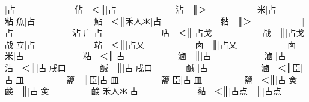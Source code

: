 {\cjk{}{\cnsym{}　　　　　}}|{\cjk{}占{\cnsym{}　　　　　　　}佔{\cnsym{}　}＜}║{\cjk{}{\cnsym{}　　　　　　}}|{\cjk{}占{\cnsym{}　　　　　　　}沾{\cnsym{}　}}║{\cjk{}＞{\cnsym{}　　　　　　}米}|{\cjk{}占{\cnsym{}　　　　　　　}粘} 
{\cjk{}{\cnsym{}　　　　　}魚}|{\cjk{}占{\cnsym{}　　　　　　　}鮎{\cnsym{}　}＜}║{\cjk{}{\cnsym{}　　　　}禾人氺}|{\cjk{}占{\cnsym{}　　　　　　　}黏{\cnsym{}　}}║{\cjk{}＞{\cnsym{}　　　　　　}}|{\cjk{}占{\cnsym{}　　　　　　　}沾} 
{\cjk{}{\cnsym{}　　　　　}广}|{\cjk{}占{\cnsym{}　　　　　　　}店{\cnsym{}　}＜}║{\cjk{}{\cnsym{}　　　　　　　}}|{\cjk{}占戈{\cnsym{}　　　　　　}战{\cnsym{}　}}║{\cjk{}{\cnsym{}　　　　　　　　}}|{\cjk{}占戈{\cnsym{}　　　　　　}战} 
{\cjk{}{\cnsym{}　　　　　}立}|{\cjk{}占{\cnsym{}　　　　　　　}站{\cnsym{}　}＜}║{\cjk{}{\cnsym{}　　　　　　　}}|{\cjk{}占乂{\cnsym{}　　　　　　}卤{\cnsym{}　}}║{\cjk{}{\cnsym{}　　　　　　　　}}|{\cjk{}占乂{\cnsym{}　　　　　　}卤} 
{\cjk{}{\cnsym{}　　　　　}米}|{\cjk{}占{\cnsym{}　　　　　　　}粘{\cnsym{}　}＜}║{\cjk{}{\cnsym{}　　　　　　}}|{\cjk{}占{\cnxb{}𠂭}{\cnsym{}　　　　　　}滷{\cnsym{}　}}║{\cjk{}{\cnsym{}　　　　　　　}}|{\cjk{}占{\cnxb{}𠂭}{\cnsym{}　　　　　　}滷} 
{\cjk{}{\cnsym{}　　　　　}}|{\cjk{}占{\cnsym{}　　　　　　　}沾{\cnsym{}　}＜}║{\cjk{}{\cnsym{}　　　　　　　}}|{\cjk{}占{\cnxb{}𠂭}戌口{\cnsym{}　　　　}鹹{\cnsym{}　}}║{\cjk{}{\cnsym{}　　　　　　　　}}|{\cjk{}占{\cnxb{}𠂭}戌口{\cnsym{}　　　　}鹹} 
{\cjk{}{\cnsym{}　　　　　}}|{\cjk{}占{\cnxb{}𠂭}{\cnsym{}　　　　　　}滷{\cnsym{}　}＜}║{\cjk{}{\cnsym{}　　　　　}臣}|{\cjk{}占{\cnxb{}𠂭}皿{\cnsym{}　　　　　}鹽{\cnsym{}　}}║{\cjk{}{\cnsym{}　　　　　　}臣}|{\cjk{}占{\cnxb{}𠂭}皿{\cnsym{}　　　　　}鹽} 
{\cjk{}{\cnsym{}　　　　}臣}|{\cjk{}占{\cnxb{}𠂭}皿{\cnsym{}　　　　　}鹽{\cnsym{}　}＜}║{\cjk{}{\cnsym{}　　　　　　　}}|{\cjk{}占{\cnxb{}𠂭}{\cnxa{}㑒}{\cnsym{}　　　　　}鹸{\cnsym{}　}}║{\cjk{}{\cnsym{}　　　　　　　　}}|{\cjk{}占{\cnxb{}𠂭}{\cnxa{}㑒}{\cnsym{}　　　　　}鹸} 
{\cjk{}{\cnsym{}　　　}禾人氺}|{\cjk{}占{\cnsym{}　　　　　　　}黏{\cnsym{}　}＜}║{\cjk{}{\cnsym{}　　　　　　　}}|{\cjk{}占点{\cnsym{}　}}║{\cjk{}{\cnsym{}　　　　　　　　}}|{\cjk{}占点} 

